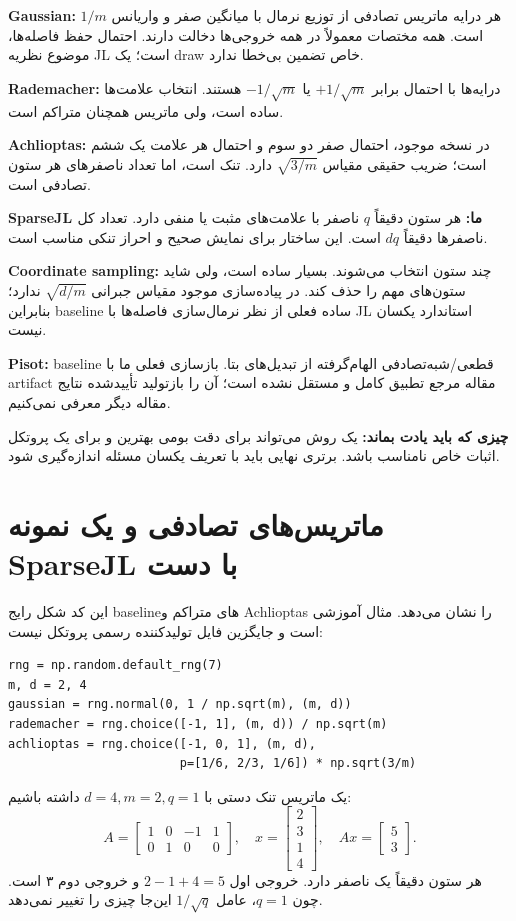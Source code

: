 \documentclass[11pt,a4paper]{article}
\newcommand{\lesson}[1]{\clearpage\section{#1}}
\newcommand{\takeaway}[1]{\par\textbf{چیزی که باید یادت بماند:} #1\par}
\begin{document}
\textbf{Gaussian:} هر درایه ماتریس تصادفی از توزیع نرمال با میانگین صفر و واریانس \(1/m\) است. همه مختصات معمولاً در همه خروجی‌ها دخالت دارند. احتمال حفظ فاصله‌ها، موضوع نظریه JL است؛ یک draw خاص تضمین بی‌خطا ندارد.

\textbf{Rademacher:} درایه‌ها با احتمال برابر \(+1/\sqrt m\) یا \(-1/\sqrt m\) هستند. انتخاب علامت‌ها ساده است، ولی ماتریس همچنان متراکم است.

\textbf{Achlioptas:} در نسخه موجود، احتمال صفر دو سوم و احتمال هر علامت یک ششم است؛ ضریب حقیقی مقیاس \(\sqrt{3/m}\) دارد. تنک است، اما تعداد ناصفرهای هر ستون تصادفی است.

\textbf{SparseJL ما:} هر ستون دقیقاً \(q\) ناصفر با علامت‌های مثبت یا منفی دارد. تعداد کل ناصفرها دقیقاً \(dq\) است. این ساختار برای نمایش صحیح و احراز تنکی مناسب است.

\textbf{Coordinate sampling:} چند ستون انتخاب می‌شوند. بسیار ساده است، ولی شاید ستون‌های مهم را حذف کند. در پیاده‌سازی موجود مقیاس جبرانی \(\sqrt{d/m}\) ندارد؛ بنابراین baseline ساده فعلی از نظر نرمال‌سازی فاصله‌ها با JL استاندارد یکسان نیست.

\textbf{Pisot:} baseline قطعی/شبه‌تصادفی الهام‌گرفته از تبدیل‌های بتا. بازسازی فعلی ما با artifact مقاله مرجع تطبیق کامل و مستقل نشده است؛ آن را بازتولید تأییدشده نتایج مقاله دیگر معرفی نمی‌کنیم.

\takeaway{یک روش می‌تواند برای دقت بومی بهترین و برای یک پروتکل اثبات خاص نامناسب باشد. برتری نهایی باید با تعریف یکسان مسئله اندازه‌گیری شود.}

\lesson{ماتریس‌های تصادفی و یک نمونه SparseJL با دست}
این کد شکل رایج baselineهای متراکم و Achlioptas را نشان می‌دهد. مثال آموزشی است و جایگزین فایل تولیدکننده رسمی پروتکل نیست:
\begin{latin}\begin{lstlisting}
rng = np.random.default_rng(7)
m, d = 2, 4
gaussian = rng.normal(0, 1 / np.sqrt(m), (m, d))
rademacher = rng.choice([-1, 1], (m, d)) / np.sqrt(m)
achlioptas = rng.choice([-1, 0, 1], (m, d),
                        p=[1/6, 2/3, 1/6]) * np.sqrt(3/m)
\end{lstlisting}\end{latin}
یک ماتریس تنک دستی با \(d=4,m=2,q=1\) داشته باشیم:
\[
 A=\begin{bmatrix}1&0&-1&1\\0&1&0&0\end{bmatrix},
 \quad x=\begin{bmatrix}2\\3\\1\\4\end{bmatrix},
 \quad Ax=\begin{bmatrix}5\\3\end{bmatrix}.
\]
هر ستون دقیقاً یک ناصفر دارد. خروجی اول \(2-1+4=5\) و خروجی دوم ۳ است. چون \(q=1\)، عامل \(1/\sqrt q\) این‌جا چیزی را تغییر نمی‌دهد.
\end{document}
